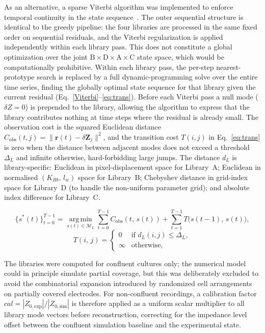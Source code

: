 \documentclass[english, 10pt, a4paper]{article}
\begin{document}
As an alternative, a sparse Viterbi algorithm was implemented to enforce temporal continuity in the state sequence~\cite{forney2005viterbi}. The outer sequential structure is identical to the greedy pipeline: the four libraries are processed in the same fixed order on sequential residuals, and the Viterbi regularization is applied independently within each library pass. This does not constitute a global optimization over the joint $\text{B}\times\text{D}\times\text{A}\times\text{C}$ state space, which would be computationally prohibitive. Within each library pass, the per-step nearest-prototype search is replaced by a full dynamic-programming solve over the entire time series, finding the globally optimal state sequence for that library given the current residual (Eq.~\ref{Viterbi}--\ref{eq:trans}). Before each Viterbi pass a null mode ($\delta Z = 0$) is prepended to the library, allowing the algorithm to express that the library contributes nothing at time steps where the residual is already small. The observation cost is the squared Euclidean distance $C_\text{obs}(t,j)=\|\mathbf{r}(t)-\delta\mathbf{Z}_j\|^2$, and the transition cost $T(i,j)$ in Eq.~\ref{eq:trans} is zero when the distance between adjacent modes does not exceed a threshold $\Delta_L$ and infinite otherwise, hard-forbidding large jumps. The distance $d_L$ is library-specific: Euclidean in pixel-displacement space for Library~A; Euclidean in normalised $(K_{Rb},\,l_w)$ space for Library~B; Chebyshev distance in grid-index space for Library~D (to handle the non-uniform parameter grid); and absolute index difference for Library~C.

\begin{equation}\label{Viterbi}
 \{s^*(t)\}_{t=0}^{T-1} = \operatorname*{arg\,min}_{s(t)\in\mathcal{M}_L}
\sum_{t=0}^{T-1} C_\text{obs}(t,\,s(t))
   + \sum_{t=1}^{T-1} T\!\bigl(s(t{-}1),\,s(t)\bigr),
\end{equation}
\begin{equation}\label{eq:trans}
 T(i,\,j) =
 \begin{cases}
   0      & \text{if } d_L(i,j) \le \Delta_L, \\
   \infty & \text{otherwise,}
 \end{cases}
\end{equation}

The libraries were computed for confluent cultures only; the numerical model could in principle simulate partial coverage, but this was deliberately excluded to avoid the combinatorial expansion introduced by randomized cell arrangements on partially covered electrodes. For non-confluent recordings, a calibration factor $\mathit{cal} = |Z_{0,\text{exp}}|/|Z_{0,\text{sim}}|$ is therefore applied as a uniform scalar multiplier to all library mode vectors before reconstruction, correcting for the impedance level offset between the confluent simulation baseline and the experimental state.
\end{document}
